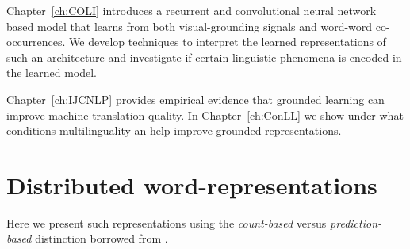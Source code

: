 Chapter~\ref{ch:COLI} introduces a recurrent and convolutional neural network
based model that learns from both visual-grounding signals and
word-word co-occurrences. We develop techniques to interpret the learned
representations of such an architecture and investigate if certain linguistic
phenomena is encoded in the learned model.

Chapter~\ref{ch:IJCNLP} provides empirical evidence that grounded learning
can improve machine translation quality.
In Chapter~\ref{ch:ConLL} we show under what conditions multilinguality an help improve grounded
representations.




\section{Distributed word-representations}
\label{sec:words}
Here we present such representations using the \emph{count-based}
versus \emph{prediction-based} distinction borrowed from \cite{baroni2014don}.

